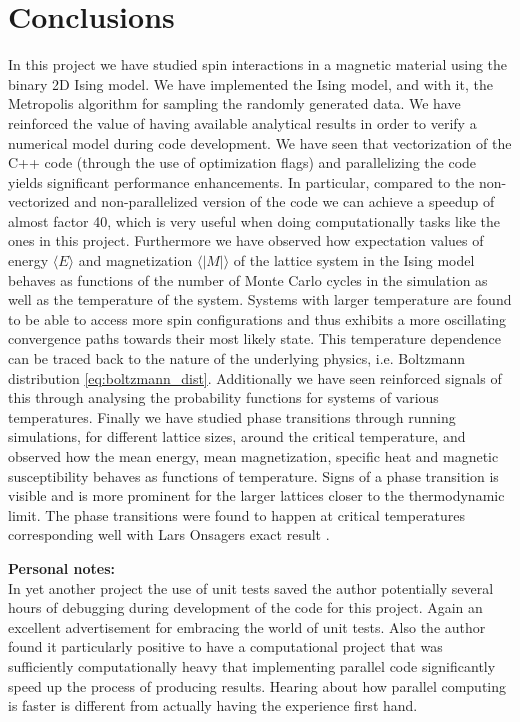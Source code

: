 \documentclass[12pt]{article}
\numberwithin{figure}{section}
\numberwithin{table}{section}
\begin{document}
\section{Conclusions}
In this project we have studied spin interactions in a magnetic material using the binary 2D Ising model. We have implemented the Ising model, and with it, the Metropolis algorithm for sampling the randomly generated data. We have reinforced the value of having available analytical results in order to verify a numerical model during code development. We have seen that vectorization of the C++ code (through the use of optimization flags) and parallelizing the code yields significant performance enhancements. In particular, compared to the non-vectorized and non-parallelized version of the code we can achieve a speedup of almost factor 40, which is very useful when doing computationally tasks like the ones in this project. Furthermore we have observed how expectation values of energy $\langle E \rangle$ and magnetization $\langle |M| \rangle$ of the lattice system in the Ising model behaves as functions of the number of Monte Carlo cycles in the simulation as well as the temperature of the system. Systems with larger temperature are found to be able to access more spin configurations and thus exhibits a more oscillating convergence paths towards their most likely state. This temperature dependence can be traced back to the nature of the underlying physics, i.e. Boltzmann distribution \eqref{eq:boltzmann_dist}. Additionally we have seen reinforced signals of this through analysing the probability functions for systems of various temperatures. Finally we have studied phase transitions through running simulations, for different lattice sizes, around the critical temperature, and observed how the mean energy, mean magnetization, specific heat and magnetic susceptibility behaves as functions of temperature. Signs of a phase transition is visible and is more prominent for the larger lattices closer to the thermodynamic limit. The phase transitions were found to happen at critical temperatures corresponding well with Lars Onsagers exact result \cite{LarsOnsager}.
\vspace{0.30cm}

\noindent \textbf{Personal notes:}\\
In yet another project the use of unit tests saved the author potentially several hours of debugging during development of the code for this project. Again an excellent advertisement for embracing the world of unit tests. Also the author found it particularly positive to have a computational project that was sufficiently computationally heavy that implementing parallel code significantly speed up the process of producing results. Hearing about how parallel computing is faster is different from actually having the experience first hand.


\pagebreak



\end{document}
